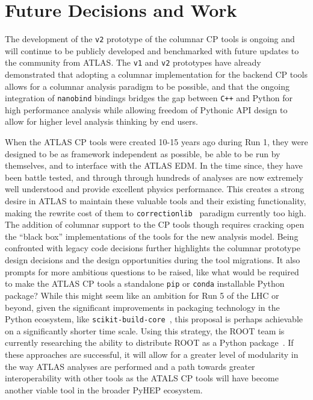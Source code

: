 \section{Future Decisions and Work}\label{sec:conclusions}

The development of the \texttt{v2} prototype of the columnar CP tools is ongoing and will continue to be publicly developed and benchmarked with future updates to the community from ATLAS.
The \texttt{v1} and \texttt{v2} prototypes have already demonstrated that adopting a columnar implementation for the backend CP tools allows for a columnar analysis paradigm to be possible, and that the ongoing integration of \texttt{nanobind} bindings bridges the gap between \texttt{C++} and Python for high performance analysis while allowing freedom of Pythonic API design to allow for higher level analysis thinking by end users.

When the ATLAS CP tools were created 10-15 years ago during Run 1, they were designed to be as framework independent as possible, be able to be run by themselves, and to interface with the ATLAS EDM.
In the time since, they have been battle tested, and through through hundreds of analyses are now extremely well understood and provide excellent physics performance.
This creates a strong desire in ATLAS to maintain these valuable tools and their existing functionality, making the rewrite cost of them to \texttt{correctionlib}~\cite{correctionlib_2024} paradigm currently too high.
The addition of columnar support to the CP tools though requires cracking open the ``black box'' implementations of the tools for the new analysis model.
Being confronted with legacy code decisions further highlights the columnar prototype design decisions and the design opportunities during the tool migrations.
It also prompts for more ambitious questions to be raised, like what would be required to make the ATLAS CP tools a standalone \texttt{pip} or \texttt{conda} installable Python package?
While this might seem like an ambition for Run 5 of the LHC or beyond, given the significant improvements in packaging technology in the Python ecosystem, like \texttt{scikit-build-core}~\cite{Schreiner_Scikit-build-core_2024}, this proposal is perhaps achievable on a significantly shorter time scale.
Using this strategy, the ROOT team is currently researching the ability to distribute ROOT as a Python package~\cite{Padulano:CHEP_2024}.
If these approaches are successful, it will allow for a greater level of modularity in the way ATLAS analyses are performed and a path towards greater interoperability with other tools as the ATALS CP tools will have become another viable tool in the broader PyHEP ecosystem.
